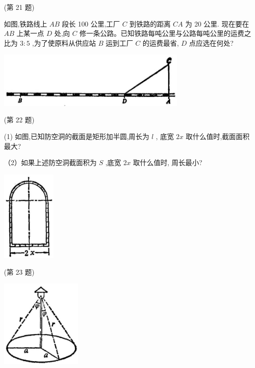 \documentclass[lang=cn,newtx,12pt,scheme=chinese]{elegantbook}
\begin{document}
\begin{problemset}[习 题 十 一]
(第 21 题)

\item 如图,铁路线上 \({AB}\) 段长 100 公里,工厂 \(C\) 到铁路的距离 \({CA}\) 为 20 公里. 现在要在 \({AB}\) 上某一点 \(D\) 处,向 \(C\) 修一条公路。已知铁路每吨公里与公路每吨公里的运费之比为 \(3 : 5\) ,为了使原料从供应站 \(B\) 运到工厂 \(C\) 的运费最省, \(D\) 点应选在何处?

\begin{center}
\includegraphics[max width=0.7\textwidth]{images/01912c18-5c3f-733d-b775-749ba9897a9d_158_819415.jpg}
\end{center}

(第 22 题)

\item (1) 如图,已知防空洞的截面是矩形加半圆,周长为 \(l\) , 底宽 \({2x}\) 取什么值时,截面面积最大?

（2）如果上述防空洞截面积为 \(S\) ,底宽 \({2x}\) 取什么值时, 周长最小?

\begin{center}
\includegraphics[max width=0.2\textwidth]{images/01912c18-5c3f-733d-b775-749ba9897a9d_159_493137.jpg}
\end{center}

(第 23 题)

\begin{center}
\includegraphics[max width=0.3\textwidth]{images/01912c18-5c3f-733d-b775-749ba9897a9d_159_646060.jpg}
\end{center}


\end{problemset}
\end{document}

